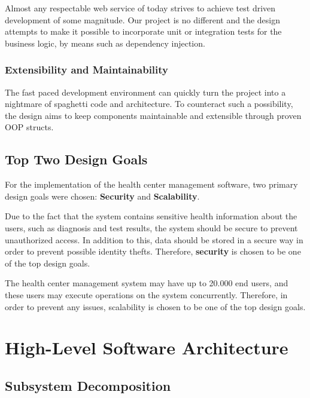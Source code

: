 \documentclass[a4paper, 12pt, titlepage]{article}
\begin{document}
  Almost any respectable web service of today strives to achieve test driven development of some magnitude.
  Our project is no different and the design attempts to make it possible to incorporate unit or integration tests
  for the business logic, by means such as dependency injection.

  \subsubsection{Extensibility and Maintainability}

  The fast paced development environment can quickly turn the project into a nightmare of spaghetti code and architecture.
  To counteract such a possibility, the design aims to keep components maintainable and extensible through proven OOP structs.

  \subsection{Top Two Design Goals}

  For the implementation of the health center management software, two primary design goals were chosen:
  \textbf{Security} and \textbf{Scalability}.

  Due to the fact that the system contains sensitive health information about the users, such as diagnosis and test results,
  the system should be secure to prevent unauthorized access. In addition to this, data should be stored in a secure way
  in order to prevent possible identity thefts. Therefore, \textbf{security} is chosen to be one of the top design goals.

  The health center management system may have up to 20.000 end users, and these users may execute operations on the system concurrently.
  Therefore, in order to prevent any issues, scalability is chosen to be one of the top design goals.

  \section{High-Level Software Architecture}

  \subsection{Subsystem Decomposition}
\end{document}
